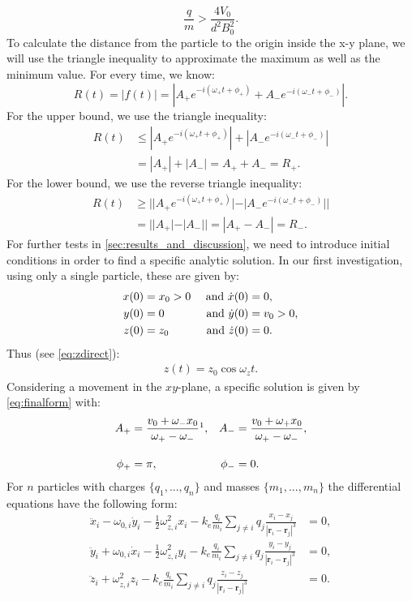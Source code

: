 \begin{equation} \label{eq:stability}
    \frac{q}{m} > \frac{4V_0}{d^2B_0^2}.
\end{equation}
To calculate the distance from the particle to the origin inside the x-y plane, we will use the triangle inequality to approximate the maximum as well as the minimum value. For every time, we know:
$$R(t) = |f(t)| = |A_+ e^{-i(\omega_+ t + \phi_+)} + A_- e^{-i(\omega_- t + \phi_-)}|.$$
For the upper bound, we use the triangle inequality:
\begin{align*}
R(t) &\le |A_+ e^{-i(\omega_+ t + \phi_+)}| + |A_- e^{-i(\omega_- t + \phi_-)}| \\
&= |A_+| + |A_-| = A_+ + A_- = R_+.
\end{align*}
For the lower bound, we use the reverse triangle inequality:
\begin{align*} 
R(t) &\ge ||A_+ e^{-i(\omega_+ t + \phi_+)}| - |A_- e^{-i(\omega_- t + \phi_-)}|| \\
&= ||A_+| - |A_-|| = |A_+ - A_-| = R_-. \end{align*}
For further tests in \cref{sec:results_and_discussion}, we need to introduce initial conditions in order to find a specific analytic solution. In our first investigation, using only a single particle, these are given by:
\begin{align}
    \centering
    x(0) &= x_0 > 0 &\text{ and } \dot{x}(0) &= 0, \\
    y(0) &= 0 &\text{ and } \dot{y}(0) &= v_0 > 0, \\
    z(0) &= z_0 &\text{ and } \dot{z}(0) &= 0.
\end{align}
Thus (see \cref{eq:zdirect}):
\begin{align*}
    z(t) = z_0 \cos{\omega_zt}.
\end{align*}
Considering a movement in the $xy$-plane, a specific solution is given by \cref{eq:finalform} with:
\begin{align*}
    A_+ &= \frac{v_0 + \omega_- x_0}{\omega_+ - \omega_-}\footnotemark, & A_- &= \frac{v_0 + \omega_+ x_0}{\omega_+ - \omega_-}, \\[10pt]
    \phi_+ &= \pi, & \phi_- &= 0.
\end{align*}
For $n$ particles with charges $\{q_1, ... , q_n\}$ and masses $\{m_1, ... , m_n\}$ the differential equations have the following form:
\begin{align*}
    \ddot{x}_i - \omega_{0,i} \dot{y}_i - \frac{1}{2} \omega_{z,i}^2 x_i - k_e \frac{q_i}{m_i} \sum_{j \neq i} q_j \frac{x_i - x_j}{|\mathbf{r}_i - \mathbf{r}_j|^3} &= 0, \\[10pt]
    \ddot{y}_i + \omega_{0,i} \dot{x}_i - \frac{1}{2} \omega_{z,i}^2 y_i - k_e \frac{q_i}{m_i} \sum_{j \neq i} q_j \frac{y_i - y_j}{|\mathbf{r}_i - \mathbf{r}_j|^3} &= 0, \\[10pt]
    \ddot{z}_i + \omega_{z,i}^2 z_i - k_e \frac{q_i}{m_i} \sum_{j \neq i} q_j \frac{z_i - z_j}{|\mathbf{r}_i - \mathbf{r}_j|^3} &= 0.
\end{align*}
